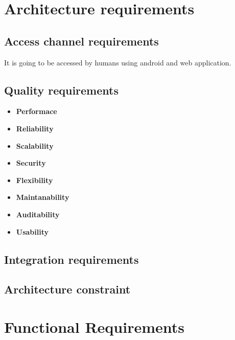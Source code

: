 \documentclass[10pt,a4paper]{article}
\begin{document}
\pagebreak
\section{Architecture requirements}
\subsection{Access channel requirements}
\indent It is going to be accessed by humans using android and web application.
                                                                                               
\subsection{Quality requirements}
\begin{itemize}
\item\textbf{Performace}

               
\item\textbf{Reliability}
  
\item\textbf{Scalability}

 
\item\textbf{Security}

\item\textbf{Flexibility} 

\item\textbf{Maintanability}					
                         
\item\textbf{Auditability}         
          
\item\textbf{Usability}
                                                              
 \end{itemize}
\subsection{Integration requirements}
                
\subsection{Architecture constraint}                       

\pagebreak

\section{Functional Requirements}
\end{document}
